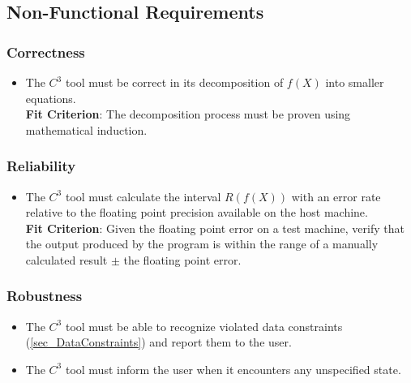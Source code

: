 \documentclass[12pt]{article}
\newcommand{\prognameAbbrv}{$C^{3}$}
\begin{document}

\subsection{Non-Functional Requirements}

\subsubsection*{Correctness}
\begin{itemize}
	\item The \prognameAbbrv{} tool must be correct in its decomposition of 
	$f(X)$ into smaller equations.\\ \textbf{Fit Criterion}: The decomposition 
	process must be proven using mathematical induction.
\end{itemize}

\subsubsection*{Reliability}
\begin{itemize}
	\item The \prognameAbbrv{} tool must calculate the interval $R(f(X))$ with 
	an error rate relative to the floating point precision available on the 
	host machine. \\ \textbf{Fit Criterion}: Given the floating point error on 
	a test machine, verify that the output produced by the program is within 
	the range of a manually calculated result $\pm$ the floating point error.
\end{itemize}

\subsubsection*{Robustness}
\begin{itemize}
	\item The \prognameAbbrv{} tool must be able to recognize violated data 
	constraints (\ref{sec_DataConstraints}) and report them to the user.
	\item The \prognameAbbrv{} tool must inform the user when it encounters any 
	unspecified state.
\end{itemize}
\end{document}
